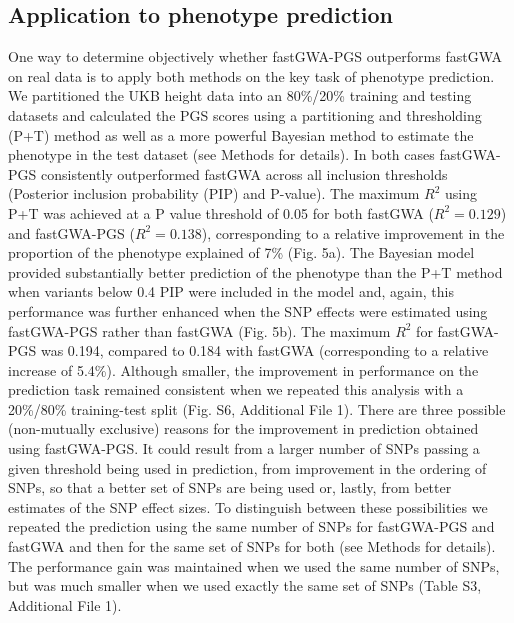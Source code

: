 \documentclass[fleqn,10pt]{wlscirep}
\begin{document}
\subsection*{Application to phenotype prediction }
One way to determine objectively whether fastGWA-PGS outperforms fastGWA on real data is to apply both methods on the key task of phenotype prediction. We partitioned the UKB height data into an 80\%/20\% training and testing datasets and calculated the PGS scores using a partitioning and thresholding (P+T) method as well as a more powerful Bayesian method to estimate the phenotype in the test dataset (see Methods for details).  In both cases fastGWA-PGS consistently outperformed fastGWA across all inclusion thresholds (Posterior inclusion probability (PIP) and P-value).  The maximum $R^2$ using P+T was achieved at a P value threshold of 0.05 for both fastGWA ($R^2= 0.129$) and fastGWA-PGS ($R^2= 0.138$), corresponding to a relative improvement in the proportion of the phenotype explained of 7\% (Fig. 5a). The Bayesian model provided substantially better prediction of the phenotype than the P+T method when variants below 0.4 PIP were included in the model and, again, this performance was further enhanced when the SNP effects were estimated using fastGWA-PGS rather than fastGWA (Fig. 5b). The maximum $R^2$ for fastGWA-PGS was 0.194, compared to 0.184 with fastGWA (corresponding to a relative increase of 5.4\%). Although smaller, the improvement in performance on the prediction task remained consistent when we repeated this analysis with a 20\%/80\% training-test split (Fig. S6, Additional File 1). There are three possible (non-mutually exclusive) reasons for the improvement in prediction obtained using fastGWA-PGS. It could result from a larger number of SNPs passing a given threshold being used in prediction, from improvement in the ordering of SNPs, so that a better set of SNPs are being used or, lastly, from better estimates of the SNP effect sizes. To distinguish between these possibilities we repeated the prediction using the same number of SNPs for fastGWA-PGS and fastGWA and then for the same set of SNPs for both (see Methods for details). The performance gain was maintained when we used the same number of SNPs, but was much smaller when we used exactly the same set of SNPs (Table S3, Additional File 1). 
\par
\end{document}
